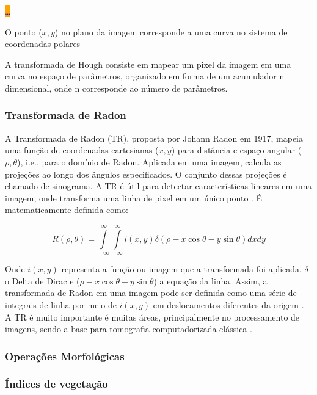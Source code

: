 \documentclass[12pt, a4paper, english, brazil]{article}
\newcommand{\dotsBlue}{\colorbox{orange}{\textcolor{blue}{\dots}}}
\begin{document}
\dotsBlue

O ponto ($x, y$) no plano da imagem corresponde a uma curva no sistema de  coordenadas polares



A transformada de Hough consiste em mapear um pixel da imagem em uma curva no espaço de parâmetros, organizado em forma de um acumulador n dimensional, onde n corresponde ao número de parâmetros. 

\cite{Huiying_2015}

\cite{Bah_2020}

\subsubsection{Transformada de Radon}
A Transformada de Radon (TR), proposta por Johann Radon em 1917, mapeia uma função de coordenadas cartesianas ($x, y$) para distância e espaço angular ($\rho, \theta$), i.e., para o domínio de Radon. Aplicada em uma imagem, calcula as projeções ao longo dos ângulos especificados. O conjunto dessas projeções é chamado de sinograma. A TR é útil para detectar características lineares em uma imagem, onde transforma uma linha de pixel em um único ponto \cite{Kaur_Sahambi_2015}. É matematicamente definida como:

\begin{equation}
R(\rho, \theta) = \int\limits _{-\infty}^\infty \int\limits _{-\infty}^\infty i (x, y) \delta (\rho - x\cos \theta - y\sin \theta ) dxdy
\end{equation}

Onde $i (x, y)$ representa a função ou imagem que a transformada foi aplicada, $\delta$ o Delta de Dirac e ($\rho - x\cos \theta - y\sin \theta$) a equação da linha.
Assim, a transformada de Radon em uma imagem pode ser definida como uma série de integrais de linha por meio de $i (x, y)$ em deslocamentos diferentes da origem \cite{Li_2019}. A TR é muito importante é muitas áreas, principalmente no processamento de imagens, sendo a base para tomografia computadorizada clássica \cite{Silva_Escarpinati_Backes_2021}.

\subsubsection{Operações Morfológicas}

\subsubsection{Índices de vegetação}
\end{document}

